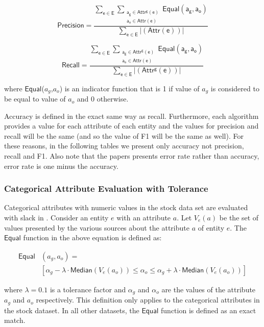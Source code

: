 \documentclass{acm_proc_article-sp}
\begin{document}
\begin{equation}
\mathsf {Precision =\frac {\sum_{e \in E}  \sum_{\substack{a_g \in Attr^g(e) \\ a_o \in Attr(e)}} \mathsf{Equal}(a_g,a_o)}{\sum_{e \in E}  |(Attr(e))| }}
\end{equation}


 \begin{equation}
\mathsf {Recall =\frac {\sum_{e \in E}  \sum_{\substack{a_g \in Attr^g(e) \\ a_o \in Attr(e)}} \mathsf{Equal}(a_g,a_o)} {\sum_{e \in E}  |(Attr^g(e))| }}
\end{equation}

where $\mathsf{Equal}$($a_g$,$a_o$) is an indicator function that is 1 if value of $a_g$ is considered to be equal to value of $a_o$  and 0 otherwise.


Accuracy is defined in the exact same way as recall. Furthermore, each algorithm  provides a value for each attribute of each entity and the values for precision and recall will be the same (and so the value of F1 will be the same as well). For these reasons, in the following tables we present only accuracy not precision, recall and F1. Also note that the papers \cite{li:resolving} presents error rate rather than accuracy, error rate is one minus the accuracy. 

\subsubsection{Categorical Attribute Evaluation with Tolerance}

Categorical attributes with numeric values in the stock data set are evaluated with slack in \cite{li:truth}. Consider an entity $e$ with an attribute $a$. Let $V_e(a)$ be the set of values presented by the various sources about the attribute $a$ of entity $e$. The $\mathsf{Equal}$ function in the above equation is defined as:

\begin{align}
\mathsf{Equal}&(a_g,a_o) =\\ \nonumber
&[\alpha_g - \lambda \cdot  \mathsf{Median}(V_e(a_o)) \leq \alpha_o \leq \alpha_g + \lambda \cdot  \mathsf{Median}(V_e(a_o))]
\end{align}

where $\lambda = 0.1$ is a tolerance factor and $\alpha_g$ and $\alpha_o$ are the values of the attribute $a_g$ and $a_o$ respectively. This definition only applies to the categorical attributes in the stock dataset. In all other datasets, the $\mathsf{Equal}$ function is defined as an exact match.
\end{document}
